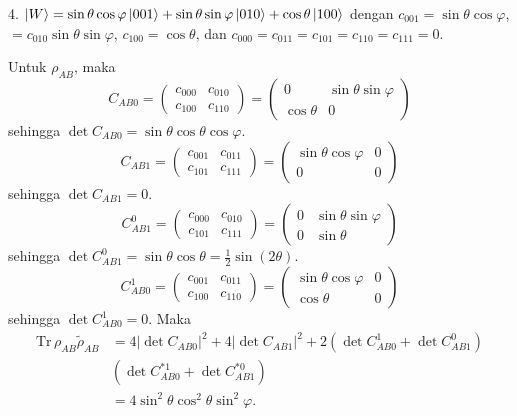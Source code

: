 4. { $\ket{W}=\sin\theta\cos\varphi\ket{001}+\sin\theta\sin\varphi\ket{010}+\cos\theta\ket{100}$}
dengan $c_{001}=\sin\theta\cos\varphi$, $=c_{010}\sin\theta\sin\varphi$, $c_{100}=\cos\theta$, dan $c_{000}=c_{011}=c_{101}=c_{110}=c_{111}=0$.

Untuk $\rho_{AB}$, maka
\begin{equation}
	C_{AB0}=
	\begin{pmatrix}
		c_{000} & c_{010} \\
		c_{100} & c_{110}
	\end{pmatrix}=
	\begin{pmatrix}
		0 & \sin\theta\sin\varphi \\
		\cos\theta & 0
	\end{pmatrix}
\end{equation}
sehingga $\det C_{AB0} = \sin\theta\cos\theta\cos\varphi$.
\begin{equation}
	C_{AB1}=
	\begin{pmatrix}
		c_{001} & c_{011} \\
		c_{101} & c_{111}
	\end{pmatrix}=
	\begin{pmatrix}
		\sin\theta\cos\varphi & 0 \\
		0 & 0
	\end{pmatrix}
\end{equation}
sehingga $\det C_{AB1} = 0$.
\begin{equation}
	C_{AB1}^0=
	\begin{pmatrix}
		c_{000} & c_{010} \\
		c_{101} & c_{111}
	\end{pmatrix}=
	\begin{pmatrix}
		0 & \sin\theta\sin\varphi \\
		0 & \sin\theta
	\end{pmatrix}
\end{equation}
sehingga $\det C_{AB1}^0 = \sin\theta \cos\theta = \frac{1}{2}\sin(2\theta)$.
\begin{equation}
	C_{AB0}^1=
	\begin{pmatrix}
		c_{001} & c_{011} \\
		c_{100} & c_{110}
	\end{pmatrix}=
	\begin{pmatrix}
		\sin\theta\cos\varphi & 0 \\
		\cos\theta & 0
	\end{pmatrix}
\end{equation}
sehingga $\det C_{AB0}^1 = 0$. Maka
\begin{equation}
	\begin{aligned}
		\mathrm{Tr}\,\rho_{AB}\tilde{\rho}_{AB}
		&=4 |\det C_{AB0}|^2+ 4 |\det C_{AB1}|^2+ 2 (\det C_{AB0}^1 + \det C_{AB1}^0)\\
		&(\det C^{*1}_{AB0} + \det C^{*0}_{AB1})\\
		&=4\sin^2\theta \cos^2\theta \sin^2\varphi.
	\end{aligned}
\end{equation}
